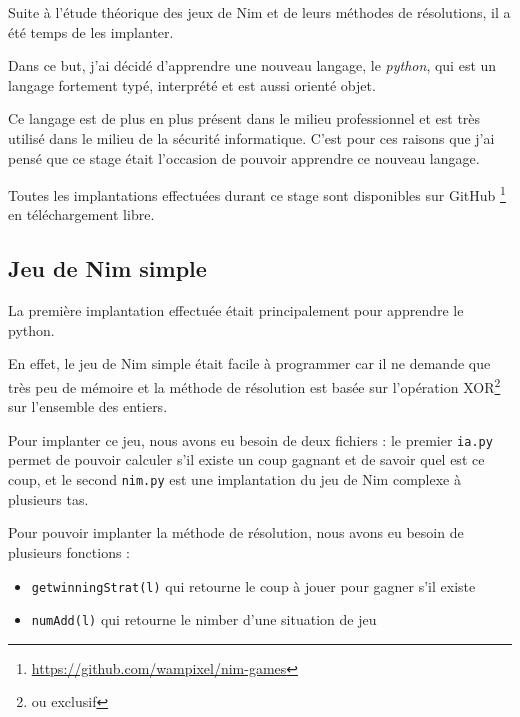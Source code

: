 Suite à l’étude théorique des jeux de Nim et de leurs méthodes de résolutions, il a été temps de les implanter.

Dans ce but, j'ai décidé d'apprendre une nouveau langage, le \textit{python}, qui est un langage fortement typé, interprété et est aussi orienté objet. 

Ce langage est de plus en plus présent dans le milieu professionnel et est très utilisé dans le milieu de la sécurité informatique. C'est pour ces raisons que j'ai pensé que ce stage était l'occasion de pouvoir apprendre ce nouveau langage.

Toutes les implantations effectuées durant ce stage sont disponibles sur GitHub \footnote{\url{https://github.com/wampixel/nim-games}} en téléchargement libre.
\subsection{Jeu de Nim simple}
\label{sub:Jeu de Nim simple}

La première implantation effectuée était principalement pour apprendre le python.

En effet, le jeu de Nim simple était facile à programmer car il ne demande que très peu de mémoire et la méthode de résolution est basée sur l’opération XOR\footnote{ou exclusif} sur l'ensemble des entiers.

Pour implanter ce jeu, nous avons eu besoin de deux fichiers : le premier \texttt{ia.py} permet de pouvoir calculer s'il existe un coup gagnant et de savoir quel est ce coup, et le second \texttt{nim.py} est une implantation du jeu de Nim complexe à plusieurs tas.

Pour pouvoir implanter la méthode de résolution, nous avons eu besoin de plusieurs fonctions :
\begin{itemize}
  \item \texttt{getwinningStrat(l)} qui retourne le coup à jouer pour gagner s'il existe
  \item \texttt{numAdd(l)} qui retourne le nimber d'une situation de jeu 
\end{itemize}


